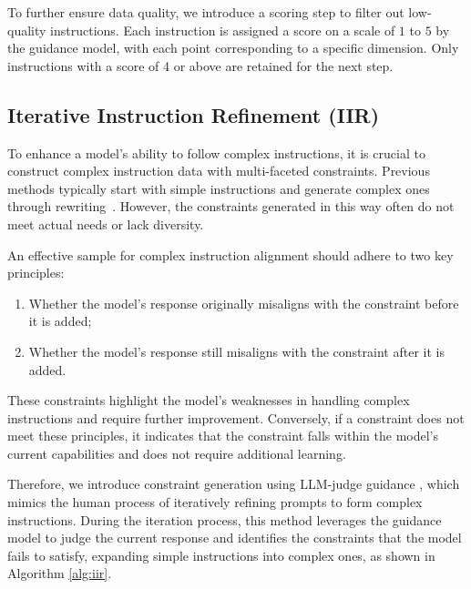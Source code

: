 To further ensure data quality, we introduce a scoring step to filter out low-quality instructions. Each instruction is assigned a score on a scale of $1$ to $5$ by the guidance model, with each point corresponding to a specific dimension. Only instructions with a score of 4 or above are retained for the next step.


\subsection{Iterative Instruction Refinement (IIR)}
\label{sec:IIR}
To enhance a model’s ability to follow complex instructions, it is crucial to construct complex instruction data with multi-faceted constraints. Previous methods typically start with simple instructions and generate complex ones through rewriting~\citep{xu2023wizardlm}. However, the constraints generated in this way often do not meet actual needs or lack diversity.



An effective sample for complex instruction alignment should adhere to two key principles:

\begin{enumerate}[itemsep=1mm, parsep=0pt]
    \item Whether the model’s response originally misaligns with the constraint before it is added;
    \item Whether the model’s response still misaligns with the constraint after it is added.
\end{enumerate}

These constraints highlight the model’s weaknesses in handling complex instructions and require further improvement. Conversely, if a constraint does not meet these principles, it indicates that the constraint falls within the model’s current capabilities and does not require additional learning.

Therefore, we introduce constraint generation using LLM-judge guidance \citep{zheng2023judging}, which mimics the human process of iteratively refining prompts to form complex instructions. During the iteration process, this method leverages the guidance model to judge the current response and identifies the constraints that the model fails to satisfy, expanding simple instructions into complex ones, as shown in Algorithm \ref{alg:iir}.

